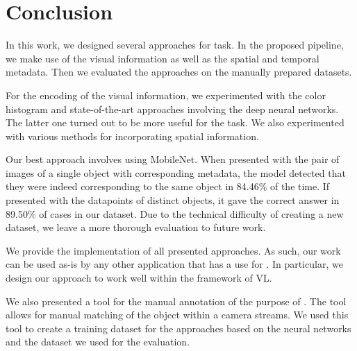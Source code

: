 \chapter*{Conclusion}

In this work, we designed several approaches for \reid{} task. In the proposed pipeline, we make use of the visual information as well as the spatial and temporal metadata. Then we evaluated the approaches on the manually prepared datasets.

For the encoding of the visual information, we experimented with the color histogram and state-of-the-art approaches involving the deep neural networks. The latter one turned out to be more useful for the \reid{} task. We also experimented with various methods for incorporating spatial information.

Our best approach involves using MobileNet. When presented with the pair of images of a single object with corresponding metadata, the model detected that they were indeed corresponding to the same object in 84.46\% of the time. If presented with the datapoints of distinct objects, it gave the correct answer in 89.50\% of cases in our dataset. Due to the technical difficulty of creating a new dataset, we leave a more thorough evaluation to future work.



We provide the implementation of all presented approaches. As such, our work can be used as-is by any other application that has a use for \reid{}. In particular, we design our approach to work well within the framework of \gls{VL}.

We also presented a tool for the manual annotation of the purpose of \reid{}. The tool allows for manual matching of the object within a camera streams. We used this tool to create a training dataset for the approaches based on the neural networks and the dataset we used for the evaluation.


